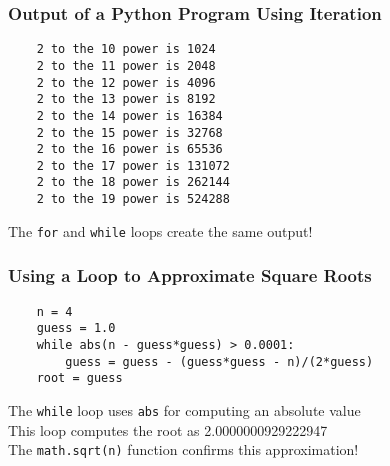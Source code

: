 \documentclass[14pt,aspectratio=169]{beamer}
\begin{document}
%
\begin{frame}[fragile]
  \frametitle{Output of a Python Program Using Iteration}
  \normalsize
  \hspace*{-.35in}
  \begin{minipage}{6in}
    \vspace*{.25in}
    \begin{verbatim}
    2 to the 10 power is 1024
    2 to the 11 power is 2048
    2 to the 12 power is 4096
    2 to the 13 power is 8192
    2 to the 14 power is 16384
    2 to the 15 power is 32768
    2 to the 16 power is 65536
    2 to the 17 power is 131072
    2 to the 18 power is 262144
    2 to the 19 power is 524288
    \end{verbatim}
  \end{minipage}
  \vspace*{.05in}
  \begin{center}
    \normalsize \noindent The {\tt for} and {\tt while} loops create the same output!\\
  \end{center}
\end{frame}

%
\begin{frame}[fragile]
  \frametitle{Using a Loop to Approximate Square Roots}
  \normalsize
  \hspace*{-.45in}
  \begin{minipage}{6in}
    \vspace*{.25in}
    \begin{verbatim}
    n = 4
    guess = 1.0
    while abs(n - guess*guess) > 0.0001:
        guess = guess - (guess*guess - n)/(2*guess)
    root = guess
    \end{verbatim}
  \end{minipage}
  \vspace*{.1in}
  \begin{center}
    \normalsize \noindent The {\tt while} loop uses {\tt abs} for computing an absolute value\\
    \normalsize \noindent This loop computes the root as 2.0000000929222947\\
    \normalsize \noindent The {\tt math.sqrt(n)} function confirms this approximation!\\
  \end{center}
\end{frame}
\end{document}
